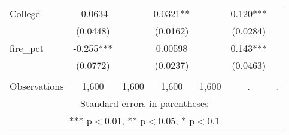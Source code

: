 \begin{tabular}{lcccccc}
College & -0.0634 &  & 0.0321** &  & 0.120*** &  \\
 & (0.0448) &  & (0.0162) &  & (0.0284) &  \\
fire\_pct & -0.255*** &  & 0.00598 &  & 0.143*** &  \\
 & (0.0772) &  & (0.0237) &  & (0.0463) &  \\
 &  &  &  &  &  &  \\
 Observations & 1,600 & 1,600 & 1,600 & 1,600 & . & . \\ \hline
\multicolumn{7}{c}{ Standard errors in parentheses} \\
\multicolumn{7}{c}{ *** p$<$0.01, ** p$<$0.05, * p$<$0.1} \\
\end{tabular}

